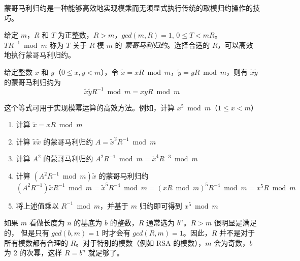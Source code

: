 
蒙哥马利归约是一种能够高效地实现模乘而无须显式执行传统的取模归约操作的技巧。

给定 \(m\)，\(R\) 和 \(T\) 为正整数，\(R>m\)，\(gcd(m, R)=1\), \(0 \le T < mR\)。\( TR^{-1} \bmod m\) 称为 \(T\) 关于 \(R\) 模 \(m\) 的 \textit{蒙哥马利归约}。选择合适的 \(R\)，可以高效地执行蒙哥马利归约。

给定整数 \(x\) 和 \(y\)（\(0\le x,y <m\)），令 \(\tilde{x} = xR \bmod m\)，\(\tilde{y} = yR \bmod m\)，则有 \(\tilde{x}\tilde{y}\) 的蒙哥马利归约为
\[
  \tilde{x}\tilde{y}R^{-1}\bmod m = xyR \bmod m 
\]

这个等式可用于实现模幂运算的高效方法。例如，计算 \(x^5 \bmod m\)（\(1\le x<m\)）
\begin{enumerate}
  \item 计算 \(\tilde{x}=xR\bmod m\)
  \item 计算 \(\tilde{x}\tilde{x}\) 的蒙哥马利归约 \(A=\tilde{x}^2R^{-1}\bmod m\)
  \item 计算 \(A^2\) 的蒙哥马利归约 \(A^2R^{-1}\bmod m=\tilde{x}^4R^{-3}\bmod m\)
  \item 计算 \((A^2R^{-1}\bmod m)\tilde{x}\) 的蒙哥马利归约
    \[
      (A^2R^{-1})\tilde{x}R^{-1}\bmod m = \tilde{x}^5R^{-4}\bmod m = (xR\bmod m)^5 R^{-4} \bmod m = x^5R\bmod m
    \]
  \item 将上述值乘以 \(R^{-1}\bmod m\)，并基于 \(m\) 归约即可得到 \(x^5\bmod m\)
\end{enumerate}

如果 \(m\) 看做长度为 \(n\) 的基底为 \(b\) 的整数，\(R\) 通常选为 \(b^n\)。\(R>m\) 很明显是满足的，
但是只有 \(gcd(b,m)=1\) 时才会有 \(gcd(R,m)=1\)。因此，\(R\) 并不是对于所有模数都有合理的
\(R\)。对于特别的模数（例如 RSA 的模数），\(m\) 会为奇数，\(b\) 为 2 的次幂，这样 \(R=b^n\)
就足够了。

